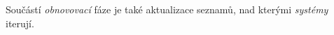 \noindent Součástí \emph{obnovovací} fáze je také aktualizace seznamů, nad kterými \emph{systémy} iterují. 



